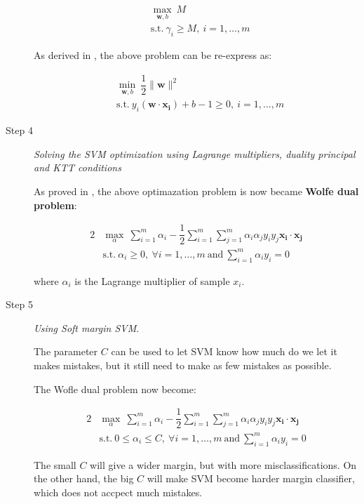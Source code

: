 \begin{description}
	\begin{align*}
		&\max_{\bm{w}, b} \ M \\
		&\text{s.t.} \ \gamma_i \geq M, \ i = 1, \ldots, m	
	\end{align*}
	
	As derived in \cite{}, the above problem can be re-express as:
	
	\begin{align*}
		&\min_{ \bm{w}, b} \ \dfrac{1}{2}\parallel\bm{w}\parallel^2 \\
		&\text{s.t.} \ y_i(\bm{w} \cdot \bm{x_i}) + b - 1 \geq 0, \ i = 1, \ldots, m	
	\end{align*}
	
	\item[Step 4] \emph{Solving the SVM optimization using Lagrange multipliers, duality principal and KTT conditions}
	
	As proved in \cite{}, the above optimazation problem is now became \textbf{Wolfe dual problem}:
	
	\begin{alignat*}{2}
		&\max_{\alpha} \ \sum_{i=1}^m \alpha_i - \dfrac{1}{2} \sum_{i=1}^m \sum_{j=1}^m \alpha_i\alpha_j y_iy_j \bm{x_i} \cdot \bm{x_j} \\
		&\text{s.t.} \ \alpha_i \geq 0, \ \forall i = 1, \ldots, m \ \text{and} \ \sum_{i=1}^m \alpha_iy_i = 0
	\end{alignat*}
	
	where $\alpha_i$ is the Lagrange multiplier of sample $x_i$.
	
	\item[Step 5] \emph{Using Soft margin SVM}.
	
	The parameter $C$ can be used to let SVM know how much do we let it makes mistakes, but it still need to make as few mistakes as possible.
	
	The Wofle dual problem now become:
	
	\begin{alignat*}{2}
		&\max_{\alpha} \ \sum_{i=1}^m \alpha_i - \dfrac{1}{2} \sum_{i=1}^m \sum_{j=1}^m \alpha_i\alpha_j y_iy_j \bm{x_i} \cdot \bm{x_j} \\
		&\text{s.t.} \ \boxed{ 0 \leq \alpha_i \leq C}, \ \forall i = 1, \ldots, m \ \text{and} \ \sum_{i=1}^m \alpha_iy_i = 0
	\end{alignat*}
	
	The small $C$ will give a wider margin, but with more misclassifications. On the other hand, the big $C$ will make SVM become harder margin classifier, which does not accpect much mistakes.
	

\end{description}
